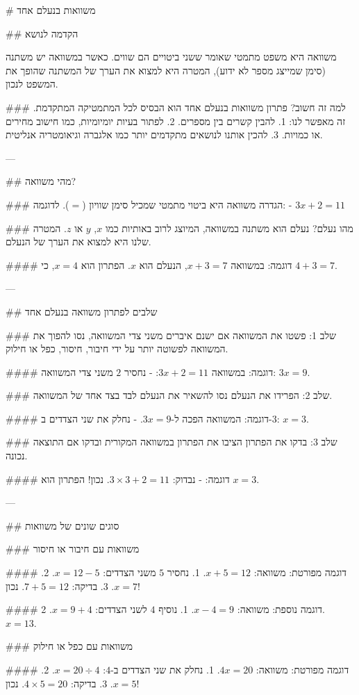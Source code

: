 # משוואות בנעלם אחד

## הקדמה לנושא

משוואה היא משפט מתמטי שאומר ששני ביטויים הם שווים. כאשר במשוואה יש משתנה (סימן שמייצג מספר לא ידוע), המטרה היא למצוא את הערך של המשתנה שהופך את המשפט לנכון.

### למה זה חשוב?
פתרון משוואות בנעלם אחד הוא הבסיס לכל המתמטיקה המתקדמת. זה מאפשר לנו:
1. להבין קשרים בין מספרים.
2. לפתור בעיות יומיומיות, כמו חישוב מחירים או כמויות.
3. להכין אותנו לנושאים מתקדמים יותר כמו אלגברה וגיאומטריה אנליטית.

---

## מהי משוואה?

### הגדרה
משוואה היא ביטוי מתמטי שמכיל סימן שוויון ($=$). לדוגמה:
- $3x + 2 = 11$

### מהו נעלם?
נעלם הוא משתנה במשוואה, המיוצג לרוב באותיות כמו $x$, $y$ או $z$. המטרה שלנו היא למצוא את הערך של הנעלם.

#### דוגמה:
במשוואה $x + 3 = 7$, הנעלם הוא $x$. הפתרון הוא $x = 4$, כי $4 + 3 = 7$.

---

## שלבים לפתרון משוואה בנעלם אחד

### שלב 1: פשטו את המשוואה
אם ישנם איברים משני צדי המשוואה, נסו להפוך את המשוואה לפשוטה יותר על ידי חיבור, חיסור, כפל או חילוק.

#### דוגמה:
במשוואה $3x + 2 = 11$:
- נחסיר $2$ משני צדי המשוואה: $3x = 9$.

### שלב 2: הפרידו את הנעלם
נסו להשאיר את הנעלם לבד בצד אחד של המשוואה.

#### דוגמה:
המשוואה הפכה ל-$3x = 9$.
- נחלק את שני הצדדים ב-$3$: $x = 3$.

### שלב 3: בדקו את הפתרון
הציבו את הפתרון במשוואה המקורית ובדקו אם התוצאה נכונה.

#### דוגמה:
- נבדוק: $3 \times 3 + 2 = 11$. נכון! הפתרון הוא $x = 3$.

---

## סוגים שונים של משוואות

### משוואות עם חיבור או חיסור

#### דוגמה מפורטת:
משוואה: $x + 5 = 12$.
1. נחסיר $5$ משני הצדדים: $x = 12 - 5$.
2. $x = 7$.
3. בדיקה: $7 + 5 = 12$. נכון!

#### דוגמה נוספת:
משוואה: $x - 4 = 9$.
1. נוסיף $4$ לשני הצדדים: $x = 9 + 4$.
2. $x = 13$.

### משוואות עם כפל או חילוק

#### דוגמה מפורטת:
משוואה: $4x = 20$.
1. נחלק את שני הצדדים ב-$4$: $x = 20 \div 4$.
2. $x = 5$.
3. בדיקה: $4 \times 5 = 20$. נכון!

